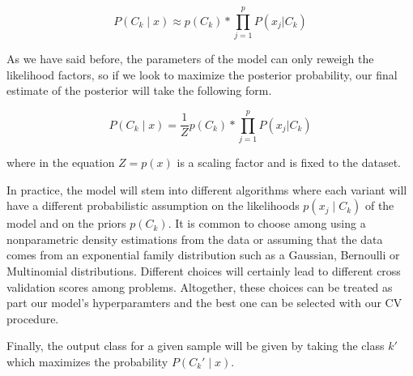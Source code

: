 \[
P(C_k \mid x) \approx p(C_k) * \prod_{j=1}^{p}    P(x_j | C_k)
\]\label{equation-posteriorProbabilityDecomposition2}

As we have said before, the parameters of the model can only reweigh the likelihood factors, so if we look to maximize the posterior probability, our final estimate of the posterior will take the following form.

\[
P(C_k \mid x) = \frac{1}{Z} p(C_k) * \prod_{j=1}^{p}    P(x_j | C_k)
\]\label{equation-posteriorProbabilityDecomposition3}

where in the equation $Z = p(x)$ is a scaling factor and is fixed to the dataset.

In practice, the model will stem into different algorithms where each variant will have a different probabilistic assumption on the likelihoods $p(x_j \mid C_k)$ of the model and on the priors $p(C_k)$. It is common to choose among using a nonparametric density estimations from the data or assuming that the data comes from an exponential family distribution such as a Gaussian, Bernoulli or Multinomial distributions. Different choices will certainly lead to different cross validation scores among problems. Altogether, these choices can be treated as part our model's hyperparamters and the best one can be selected with our CV procedure. 


Finally, the output class for a given sample will be given by taking the class $k'$ which maximizes the probability  $P(C_k' \mid x)$. 